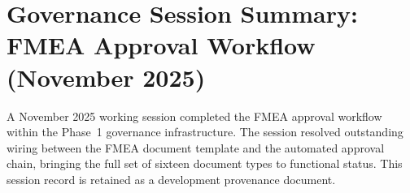 
\section*{Governance Session Summary: FMEA Approval Workflow (November 2025)}

A November 2025 working session completed the FMEA approval workflow within the
Phase~1 governance infrastructure. The session resolved outstanding wiring
between the FMEA document template and the automated approval chain, bringing
the full set of sixteen document types to functional status. This session record
is retained as a development provenance document.
